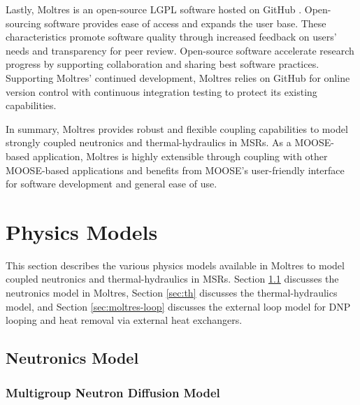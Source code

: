 Lastly, Moltres is an open-source \gls{LGPL} software hosted on
GitHub \cite{github_build_2017}. Open-sourcing software provides ease of access
and expands the user base. These characteristics promote software quality
through increased feedback on users' needs and transparency for peer review.
Open-source software accelerate research progress by supporting
collaboration and sharing best software practices. Supporting Moltres'
continued development, Moltres relies on GitHub for online version control with
continuous integration testing to protect its existing capabilities.

In summary, Moltres provides robust and flexible coupling capabilities to
model strongly coupled neutronics and thermal-hydraulics in \glspl{MSR}. As a
MOOSE-based application, Moltres is highly extensible through coupling with
other MOOSE-based applications and benefits from MOOSE's user-friendly
interface for software development and general ease of use.

\section{Physics Models} \label{sec:moltres-physics}

This section describes the various physics models available in Moltres to model
coupled neutronics and thermal-hydraulics in \glspl{MSR}. Section \ref{sec:nts}
discusses the neutronics model in Moltres, Section \ref{sec:th} discusses
the thermal-hydraulics model, and Section \ref{sec:moltres-loop} discusses the
external loop model for \gls{DNP} looping and heat removal via external heat
exchangers.

\subsection{Neutronics Model} \label{sec:nts}

\subsubsection{Multigroup Neutron Diffusion Model}

